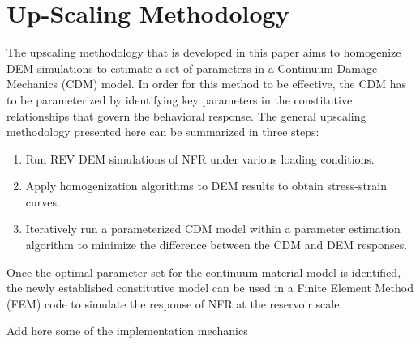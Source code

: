 \section{Up-Scaling Methodology}
The upscaling methodology that is developed in this paper aims to homogenize DEM simulations to estimate a set of parameters in a Continuum Damage Mechanics (CDM) model. In order for this method to be effective, the CDM has to be parameterized by identifying key parameters in the constitutive relationships that govern the behavioral response. The general upscaling methodology presented here can be summarized in three steps:
\begin{enumerate}
	\item Run REV DEM simulations of NFR under various loading conditions.
	\item Apply homogenization algorithms to DEM results to obtain stress-strain curves.
	\item Iteratively run a parameterized CDM model within a parameter estimation algorithm to minimize the difference between the CDM and DEM responses.
\end{enumerate}
Once the optimal parameter set for the continuum material model is identified, the newly established constitutive model can be used in a Finite Element Method (FEM) code to simulate the response of NFR at the reservoir scale.

Add here some of the implementation mechanics